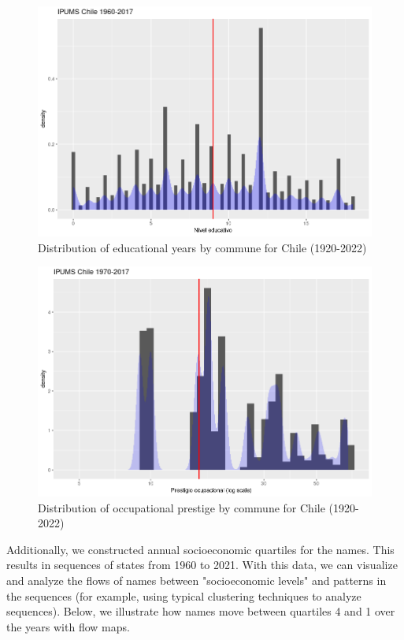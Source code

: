 \begin{enumerate}
\begin{figure}[H]
    \centering
    \includegraphics[width=13cm]{plot/nivel_educ.png}
    \caption{Distribution of educational years by commune for Chile  (1920-2022)}
    \label{}
\end{figure}



\begin{figure}[H]
    \centering
    \includegraphics[width=13cm]{plot/occup_prestige.png}
    \caption{Distribution of occupational prestige by commune for Chile (1920-2022)}
    \label{}
\end{figure}


Additionally, we constructed annual socioeconomic quartiles for the names. This results in sequences of states from 1960 to 2021. With this data, we can visualize and analyze the flows of names between "socioeconomic levels" and patterns in the sequences (for example, using typical clustering techniques to analyze sequences). Below, we illustrate how names move between quartiles 4 and 1 over the years with flow maps.



\end{enumerate}
